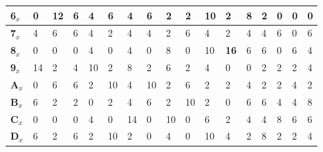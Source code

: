 \begin{longtable}[c]{|l|l|l|l|l|l|l|l|l|l|l|l|l|l|l|l|l|}
\textbf{6$_x$}  & 0              & 12             & 6              & 4              & 6              & 4              & 6              & 2              & 2              & 10             & 2              & 8              & 2              & 0              & 0              & 0              \\ \hline
\textbf{7$_x$}  & 4              & 6              & 6              & 4              & 2              & 4              & 4              & 2              & 6              & 4              & 2              & 4              & 4              & 6              & 0              & 6              \\ \hline
\textbf{8$_x$}  & 0              & 0              & 0              & 4              & 0              & 4              & 0              & 8              & 0              & 10             & \textbf{16}             & 6              & 6              & 0              & 6              & 4              \\ \hline
\textbf{9$_x$}  & 14             & 2              & 4              & 10             & 2              & 8              & 2              & 6              & 2              & 4              & 0              & 0              & 2              & 2              & 2              & 4              \\ \hline
\textbf{A$_x$}  & 0              & 6              & 6              & 2              & 10             & 4              & 10             & 2              & 6              & 2              & 2              & 4              & 2              & 2              & 4              & 2              \\ \hline
\textbf{B$_x$}  & 6              & 2              & 2              & 0              & 2              & 4              & 6              & 2              & 10             & 2              & 0              & 6              & 6              & 4              & 4              & 8              \\ \hline
\textbf{C$_x$}  & 0              & 0              & 0              & 4              & 0              & 14             & 0              & 10             & 0              & 6              & 2              & 4              & 4              & 8              & 6              & 6              \\ \hline
\textbf{D$_x$}  & 6              & 2              & 6              & 2              & 10             & 2              & 0              & 4              & 0              & 10             & 4              & 2              & 8              & 2              & 2              & 4              \\ \hline

\end{longtable}
